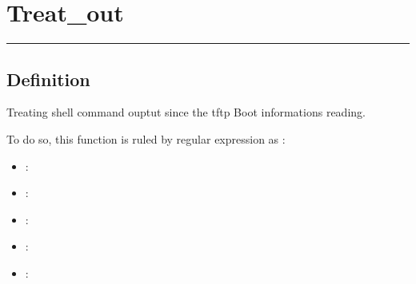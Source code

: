 \documentclass[letterpaper,10pt,english]{sphinxmanual}
\begin{document}
\sphinxstepscope

\newpage
\section{Treat\_out}
\label{\detokenize{OA/Treat_out:treat-out}}\label{\detokenize{OA/Treat_out::doc}}
\begin{sphinxVerbatim}[commandchars=\\\{\}]
 
\end{sphinxVerbatim}


\bigskip\hrule\bigskip



\subsection{Definition}
\label{\detokenize{OA/Treat_out:definition}}
\sphinxAtStartPar
Treating shell command ouptut since the tftp Boot informations reading.

\sphinxAtStartPar
To do so, this function is ruled by regular expression as :
\begin{itemize}
\item {} 
\sphinxAtStartPar
{} : 

\item {} 
\sphinxAtStartPar
{} : 

\item {} 
\sphinxAtStartPar
{} : 

\item {} 
\sphinxAtStartPar
{} : 

\item {} 
\sphinxAtStartPar
{} : 

\end{itemize}
\end{document}
